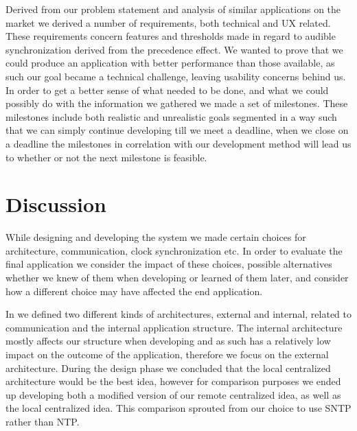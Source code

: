 Derived from our problem statement and analysis of similar applications on the market we derived a number of requirements, both technical and \ac{UX} related.
These requirements concern features and thresholds made in regard to audible synchronization derived from the precedence effect.
We wanted to prove that we could produce an application with better performance than those available, as such our goal became a technical challenge, leaving usability concerns behind us.
In order to get a better sense of what needed to be done, and what we could possibly do with the information we gathered we made a set of milestones.
These milestones include both realistic and unrealistic goals segmented in a way such that we can simply continue developing till we meet a deadline, when we close on a deadline the milestones in correlation with our development method will lead us to whether or not the next milestone is feasible.



\section{Discussion}
While designing and developing the system we made certain choices for architecture, communication, clock synchronization etc.
In order to evaluate the final application we consider the impact of these choices, possible alternatives whether we knew of them when developing or learned of them later, and consider how a different choice may have affected the end application.

In  we defined two different kinds of architectures, external and internal, related to communication and the internal application structure.
The internal architecture mostly affects our structure when developing and as such has a relatively low impact on the outcome of the application, therefore we focus on the external architecture.
During the design phase we concluded that the local centralized architecture would be the best idea, however for comparison purposes we ended up developing both a modified version of our remote centralized idea, as well as the local centralized idea.
This comparison sprouted from our choice to use \ac{SNTP} rather than \ac{NTP}.

